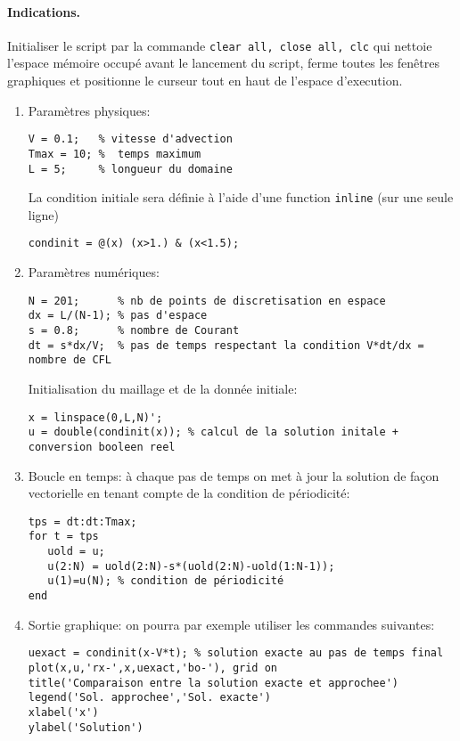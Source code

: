 \documentclass[12pt,a4paper]{article}
\begin{document}
\paragraph{Indications.} Initialiser le script par la commande \texttt{clear all, close all, clc} qui nettoie
l'espace m\'emoire occup\'e avant le lancement du script, ferme toutes les fenêtres graphiques et positionne le curseur tout en haut de l'espace d'execution.
\begin{enumerate}
\item Param\`etres physiques: 
\begin{verbatim}
V = 0.1;   % vitesse d'advection
Tmax = 10; %  temps maximum
L = 5;     % longueur du domaine
\end{verbatim}
\noindent La condition initiale sera définie à l'aide d'une function \texttt{inline} (sur une seule ligne)
\begin{verbatim}
condinit = @(x) (x>1.) & (x<1.5);
\end{verbatim}
\item Param\`etres num\'eriques:
\begin{verbatim}
N = 201;      % nb de points de discretisation en espace 
dx = L/(N-1); % pas d'espace 
s = 0.8;      % nombre de Courant 
dt = s*dx/V;  % pas de temps respectant la condition V*dt/dx = nombre de CFL
\end{verbatim}
\noindent Initialisation du maillage et de la donn\'ee initiale:
\begin{verbatim}
x = linspace(0,L,N)';
u = double(condinit(x)); % calcul de la solution initale + conversion booleen reel
\end{verbatim}
\item Boucle en temps: \`a chaque pas de temps on met \`a jour la
solution de fa\c{c}on vectorielle en tenant compte de la condition de
p\'eriodicit\'e:
\begin{verbatim}
tps = dt:dt:Tmax;
for t = tps
   uold = u; 
   u(2:N) = uold(2:N)-s*(uold(2:N)-uold(1:N-1));
   u(1)=u(N); % condition de périodicité
end
\end{verbatim}
\item Sortie graphique: on pourra par exemple utiliser les commandes suivantes:
\begin{verbatim}
uexact = condinit(x-V*t); % solution exacte au pas de temps final
plot(x,u,'rx-',x,uexact,'bo-'), grid on
title('Comparaison entre la solution exacte et approchee')
legend('Sol. approchee','Sol. exacte')
xlabel('x')
ylabel('Solution')
\end{verbatim}
\end{enumerate}
\end{document}
